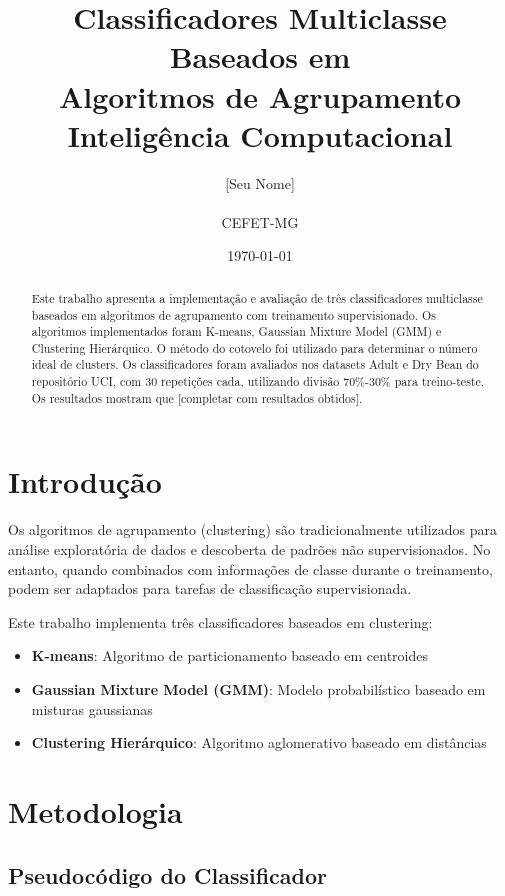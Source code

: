 \documentclass[12pt,a4paper]{article}
\title{
    \textbf{Classificadores Multiclasse Baseados em\\Algoritmos de Agrupamento}\\
    \vspace{0.5cm}
    \large Inteligência Computacional
}
\author{
    [Seu Nome]\\
    [Sua Matrícula]\\
    CEFET-MG
}
\date{\today}
\begin{document}
\maketitle

\begin{abstract}
Este trabalho apresenta a implementação e avaliação de três classificadores multiclasse baseados em algoritmos de agrupamento com treinamento supervisionado. Os algoritmos implementados foram K-means, Gaussian Mixture Model (GMM) e Clustering Hierárquico. O método do cotovelo foi utilizado para determinar o número ideal de clusters. Os classificadores foram avaliados nos datasets Adult e Dry Bean do repositório UCI, com 30 repetições cada, utilizando divisão 70\%-30\% para treino-teste. Os resultados mostram que [completar com resultados obtidos].
\end{abstract}

\section{Introdução}

Os algoritmos de agrupamento (clustering) são tradicionalmente utilizados para análise exploratória de dados e descoberta de padrões não supervisionados. No entanto, quando combinados com informações de classe durante o treinamento, podem ser adaptados para tarefas de classificação supervisionada.

Este trabalho implementa três classificadores baseados em clustering:
\begin{itemize}
    \item \textbf{K-means}: Algoritmo de particionamento baseado em centroides
    \item \textbf{Gaussian Mixture Model (GMM)}: Modelo probabilístico baseado em misturas gaussianas
    \item \textbf{Clustering Hierárquico}: Algoritmo aglomerativo baseado em distâncias
\end{itemize}

\section{Metodologia}

\subsection{Pseudocódigo do Classificador}
\end{document}
